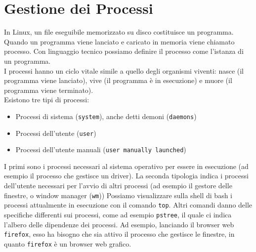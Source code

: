 \section{Gestione dei Processi}
In Linux, un file eseguibile memorizzato su disco costituisce un programma. Quando un programma viene lanciato e caricato in memoria viene chiamato processo. Con linguaggio tecnico possiamo definire il processo come l'istanza di un programma.\\
I processi hanno un ciclo vitale simile a quello degli organismi viventi: nasce (il programma viene lanciato), vive (il programma è in esecuzione) e muore (il programma viene terminato).\\
Esistono tre tipi di processi:
\begin{itemize}
	\item Processi di sistema (\verb"system"), anche detti demoni (\verb"daemons")
	\item Processi dell'utente (\verb"user")
	\item Processi dell'utente manuali (\verb"user manually launched")
\end{itemize}

I primi sono i processi necessari al sistema operativo per essere in esecuzione (ad esempio il processo che gestisce un driver). La seconda tipologia indica i processi dell'utente necessari per l'avvio di altri processi (ad esempio il gestore delle finestre, o window manager (\verb"wm"))
Possiamo visualizzare sulla shell di bash i processi attualmente in esecuzione con il comando \verb"top". Altri comandi danno delle specifiche differenti sui processi, come ad esempio \verb"pstree", il quale ci indica l'albero delle dipendenze dei processi. Ad esempio, lanciando il browser web \verb"firefox", esso ha bisogno che sia attivo il processo che gestisce le finestre, in quanto \verb"firefox" è un browser web grafico. \\

